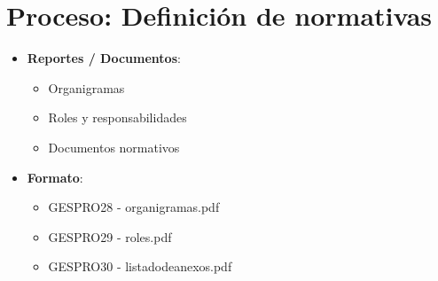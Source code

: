 \section{Proceso: Definici\'on de normativas}
%
\begin{itemize}
	\item \textbf{Reportes / Documentos}: 
	\begin{itemize}
		\item Organigramas
		\item Roles y responsabilidades
		\item Documentos normativos
	\end{itemize}
	
	\item \textbf{Formato}:
	\begin{itemize}
		\item GESPRO28 - organigramas.pdf
		\item GESPRO29 - roles.pdf
		\item GESPRO30 - listadodeanexos.pdf
	\end{itemize}
\end{itemize}